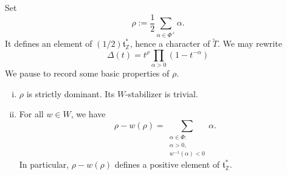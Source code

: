 \documentclass[reqno]{amsart} 
\begin{document}
Set
\begin{equation}\label{eqn:}
  \rho := \frac{1}{2} \sum_{\alpha \in \Phi^+} \alpha.
\end{equation}
It defines an element of $(1/2) \mathfrak{t}_{\mathbb{Z}}^*$, hence a character of $\tilde{T}$.  We may rewrite
\begin{equation}\label{eqn:}
  \Delta(t) =
  t^{\rho}
  \prod_{\alpha > 0}
  (1 - t^{-\alpha})
\end{equation}
We pause to record some basic properties of $\rho$.
\begin{lemma}\label{lem:rho-basic-props}
  \begin{enumerate}
[(i)]
  \item $\rho$ is strictly dominant.  Its $W$-stabilizer is trivial.
  \item For all $w \in W$, we have
    \begin{equation}\label{eqn:formula-for-rho-minus-w-rho}
      \rho - w(\rho)
      = \sum_{
        \substack{
          \alpha \in \Phi : \\
          \alpha > 0, \\
          w^{-1}(\alpha) < 0
        }
      }
      \alpha.        
    \end{equation}
    In particular, $\rho - w(\rho)$ defines a positive element of $\mathfrak{t}_{\mathbb{Z}}^*$.
  \end{enumerate}
\end{lemma}
\end{document}
